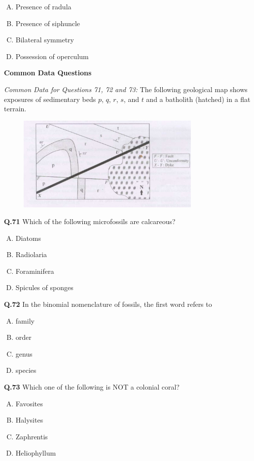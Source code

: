\begin{enumerate}[(A)]
    \item Presence of radula
    \item Presence of siphuncle
    \item Bilateral symmetry
    \item Possession of operculum
\end{enumerate}
\textbf{Common Data Questions}

\noindent\textit{Common Data for Questions 71, 72 and 73:} The following geological map shows exposures of sedimentary beds $p$, $q$, $r$, $s$, and $t$ and a batholith (hatched) in a flat terrain.\\

\begin{figure}[h] %
    \centering
    \includegraphics[width=0.8\textwidth]{gg_2008 (2)-images-9 .....jpg} %
   
    \label{fig:screenshot}
\end{figure}  

\textbf{Q.71} Which of the following microfossils are calcareous?
\begin{enumerate}[(A)]
    \item Diatoms
    \item Radiolaria
    \item Foraminifera
    \item Spicules of sponges
\end{enumerate}

\textbf{Q.72} In the binomial nomenclature of fossils, the first word refers to
\begin{multicols}{4}
    

\begin{enumerate}[(A)]
    \item family
    \item order
    \item genus
    \item species
\end{enumerate}
\end{multicols}
\textbf{Q.73} Which one of the following is NOT a colonial coral?
\begin{enumerate}[(A)]
    \item Favosites
    \item Halysites
    \item Zaphrentis
    \item Heliophyllum
\end{enumerate}

